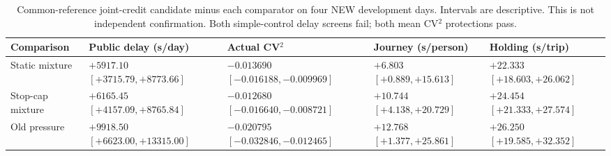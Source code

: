 \begin{table}[t]
\centering
\footnotesize
\caption{Common-reference joint-credit candidate minus each comparator on four NEW development days. Intervals are descriptive. This is not independent confirmation. Both simple-control delay screens fail; both mean CV$^2$ protections pass.}
\label{tab:joint}
\setlength{\tabcolsep}{4pt}
\begin{tabularx}{\textwidth}{@{}lYYYY@{}}
\toprule
Comparison & Public delay (s/day) & Actual CV$^2$ & Journey (s/person) & Holding (s/trip) \\
\midrule
Static mixture &  &  &  &  \\[3pt]
Stop-cap mixture &  &  &  &  \\[3pt]
Old pressure &  &  &  &  \\[3pt]
\bottomrule
\end{tabularx}
\end{table}
